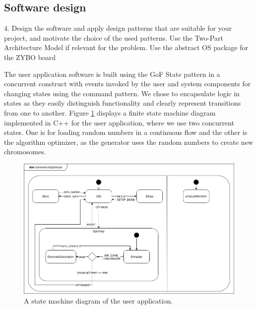\subsection{Software design}
\begin{framed}
4. Design the software and apply design patterns that are suitable for your project, and motivate the choice of the used patterns. Use the Two-Part Architecture Model if relevant for the problem. Use the abstract OS package for the ZYBO board
\end{framed}

The user application software is built using the GoF State pattern in a concurrent construct with events invoked by the user and system components for changing states using the command pattern. We chose to encapsulate logic in states as they easily distinguish functionality and clearly represent transitions from one to another. Figure \ref{fig:statemachine} displays a finite state machine diagram implemented in C++ for the user application, where we use two concurrent states. One is for loading random numbers in a continuous flow and the other is the algorithm optimizer, as the generator uses the random numbers to create new chromosomes.

\begin{figure}[h]
	\centering
	\includegraphics[width=0.9\linewidth]{../diagrams/statemachine.png}
	\caption{A state machine diagram of the user application.}
	\label{fig:statemachine}
\end{figure}

